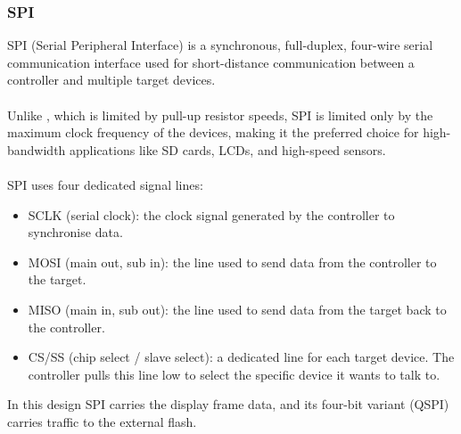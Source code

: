 \documentclass[12pt, a4paper]{article}
\begin{document}
\subsubsection{SPI} \label{prot:spi}
SPI (Serial Peripheral Interface) is a synchronous, full-duplex, four-wire
serial communication interface used for short-distance communication between a
controller and multiple target devices.\\\\
Unlike , which is limited by pull-up resistor speeds, SPI is limited only by the maximum clock
frequency of the devices, making it the preferred choice for high-bandwidth
applications like SD cards, LCDs, and high-speed sensors.\\\\
SPI uses four dedicated signal lines:
\begin{itemize}
    \item SCLK (serial clock): the clock signal generated by the controller to synchronise data.
    \item MOSI (main out, sub in): the line used to send data from the controller to the target.
    \item MISO (main in, sub out): the line used to send data from the target back to the controller.
    \item CS/SS (chip select / slave select): a dedicated line for each target device. The controller pulls this line low to select the specific device it wants to talk to.
\end{itemize}
In this design SPI carries the display frame data, and its four-bit variant
(QSPI) carries traffic to the external flash.

\end{document}
